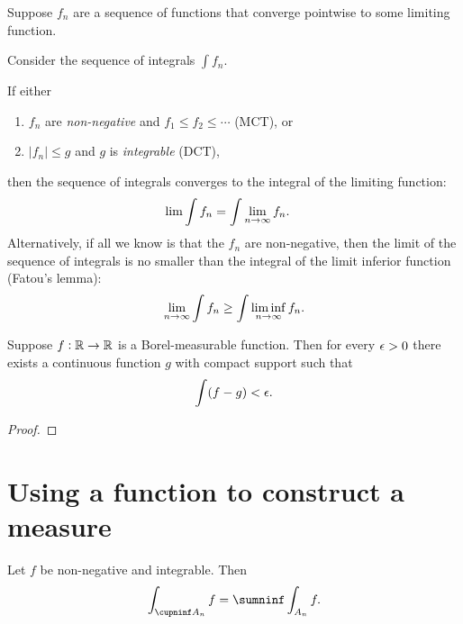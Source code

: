 \begin{theorem*}
  Suppose $f_n$ are a sequence of functions that converge pointwise to some limiting function.

  Consider the sequence of integrals $\int f_n$.

  If either
  \begin{enumerate}
  \item $f_n$ are {\it non-negative} and $f_1 \leq f_2 \leq \cdots$ (MCT), or
  \item $|f_n| \leq g$ and $g$ is {\it integrable} (DCT),
  \end{enumerate}
  then the sequence of integrals converges to the integral of the limiting function:
  \begin{align*}
    \lim \int f_n &= \int \limn f_n.
  \end{align*}
  Alternatively, if all we know is that the $f_n$ are non-negative, then the limit of the sequence of integrals
  is no smaller than the integral of the limit inferior function (Fatou's lemma):
  \begin{align*}
  \limn \int f_n \geq \int \liminf_{n\to\infty} f_n.
  \end{align*}
\end{theorem*}

\begin{theorem*}
  Suppose $f: \mathbb{R} \to \mathbb{R}$ is a Borel-measurable function. Then for every $\epsilon > 0$ there exists a continuous
  function $g$ with compact support such that
  \begin{align*}
    \int (f - g) < \epsilon.
  \end{align*}
\end{theorem*}

\begin{proof}
\end{proof}

\section{Using a function to construct a measure }


\begin{lemma}\label{lemma-integral-over-countable-disjoint-sets}
  Let $f$ be non-negative and integrable. Then
  \begin{align*}
    \int_{\cupninf A_n} f  = \sumninf \int_{A_n} f.
  \end{align*}
\end{lemma}

